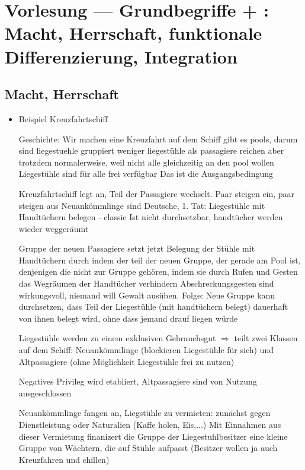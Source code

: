 \section{Vorlesung  --- Grundbegriffe  + : Macht, Herrschaft, funktionale Differenzierung, Integration}

\subsection{Macht, Herrschaft}
\begin{itemize}
	\item
		Beispiel Kreuzfahrtschiff

		Geschichte:
		Wir machen eine Kreuzfahrt
		auf dem Schiff gibt es pools, darum sind liegestuehle gruppiert
		weniger liegestühle als passagiere
		reichen aber trotzdem normalerweise, weil nicht alle gleichzeitig an den pool wollen
		Liegestühle sind für alle frei verfügbar
		Das ist die Ausgangsbedingung

		Kreuzfahrtschiff legt an, Teil der Passagiere wechselt. Paar steigen ein, paar steigen aus
		Neuankömmlinge sind Deutsche, 1. Tat: Liegestühle mit Handtüchern belegen - classic
		Ist nicht durchsetzbar, handtücher werden wieder weggeräumt

		Gruppe der neuen Passagiere setzt jetzt Belegung der Stühle mit Handtüchern durch indem der teil der neuen Gruppe, der gerade am Pool ist, denjenigen die nicht zur Gruppe gehören, indem sie durch Rufen und Gesten das Wegräumen der Handtücher verhindern
		Abschreckungsgesten sind wirkungsvoll, niemand will Gewalt ausüben.
		Folge: Neue Gruppe kann durchsetzen, dass Teil der Liegestühle (mit handtüchern belegt) dauerhaft von ihnen belegt wird, ohne dass jemand drauf liegen würde

		Liegestühle werden zu einem exklusiven Gebrauchsgut $\Rightarrow$ teilt zwei Klassen auf dem Schiff: Neuankömmlinge (blockieren Liegestühle für sich) und Altpassagiere (ohne Möglichkeit Liegestühle frei zu nutzen)

		Negatives Privileg wird etabliert, Altpassagiere sind von Nutzung ausgeschlossen

		Neuankömmlinge fangen an, Liegstühle zu vermieten: zunächst gegen Dienstleistung oder Naturalien (Kaffe holen, Eis,...)
		Mit Einnahmen aus dieser Vermietung finanizert die Gruppe der Liegestuhlbesitzer eine kleine Gruppe von Wächtern, die auf Stühle aufpasst (Besitzer wollen ja auch Kreuzfahren und chillen)


\end{itemize}

